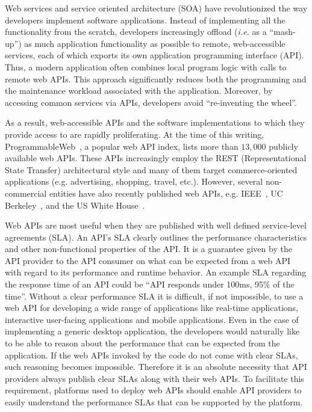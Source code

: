 Web services and service oriented architecture (SOA) have
revolutionized the way developers implement software applications.
Instead of implementing all the functionality from the scratch, developers
increasingly offload ({\em i.e.} as a ``mash-up'') as much application functionality 
as possible to remote,
web-accessible services, each of which exports its own application programming
interface (API). Thus, a modern application often combines local program logic
with calls to remote web APIs.
This approach significantly reduces both the programming and
the maintenance workload associated with the application.
Moreover, by accessing common services via APIs, developers avoid ``re-inventing the
wheel''.

As a result, web-accessible APIs and the software implementations to which
they provide access to are rapidly proliferating.
At the time of this writing, 
ProgrammableWeb~\cite{pweb}, a popular web API index, lists more than $13,000$
publicly available web APIs.
These APIs increasingly employ the REST (Representational State Transfer) architectural style and 
many of them target commerce-oriented applications (e.g. advertising, shopping, travel, etc.).
However, several non-commercial entities have also recently published web 
APIs, e.g. IEEE~\cite{ieeeapis}, UC Berkeley~\cite{ucbapis}, and the US White
House~\cite{whitehouseapis}. 

Web APIs are most useful when they are published with well defined service-level agreements (SLA). 
An API's SLA clearly outlines the performance characteristics and other non-functional 
properties of the API. It is a guarantee given by the API provider to the API consumer on what can be
expected from a web API with regard to its performance and runtime behavior. An example SLA regarding
the response time of an API could be ``API responds under 100ms, 95\% of the time''.
Without a clear performance SLA it is difficult, if not impossible,
to use a web API for developing a wide range of applications like real-time applications, interactive
user-facing applications and mobile applications. Even in the case of implementing a generic desktop
application, the developers would naturally like to be able to reason about
the performance that can be expected from the application. If the web APIs invoked by the code do
not come with clear SLAs, such reasoning becomes impossible. Therefore it is an absolute
necessity that API providers always publish clear SLAs along with their web APIs. To
facilitate this requirement, platforms used to deploy web APIs should enable API providers to 
easily understand the performance SLAs that can be supported by the platform.

